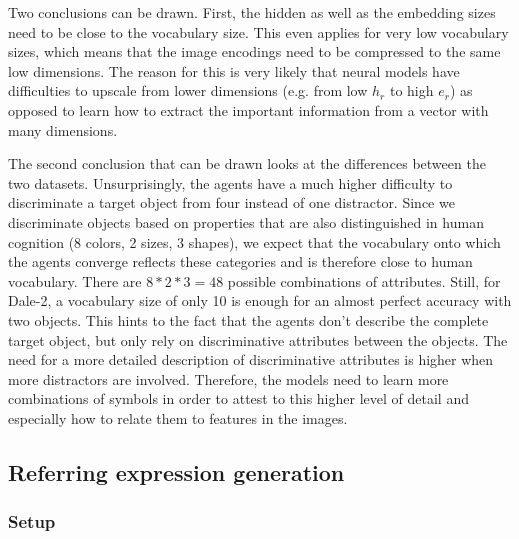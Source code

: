 Two conclusions can be drawn.
First, the hidden as well as the embedding sizes need to be close to the vocabulary size.
This even applies for very low vocabulary sizes, which means that the image encodings need to be compressed to the same low dimensions.
The reason for this is very likely that neural models have difficulties to upscale from lower dimensions (e.g. from low $h_r$ to high $e_r$) as opposed to learn how to extract the important information from a vector with many dimensions.

The second conclusion that can be drawn looks at the differences between the two datasets.
Unsurprisingly, the agents have a much higher difficulty to discriminate a target object from four instead of one distractor.
Since we discriminate objects based on properties that are also distinguished in human cognition (8 colors, 2 sizes, 3 shapes), we expect that the vocabulary onto which the agents converge reflects these categories and is therefore close to human vocabulary.
There are $8*2*3=48$ possible combinations of attributes.
Still, for Dale-2, a vocabulary size of only 10 is enough for an almost perfect accuracy with two objects.
This hints to the fact that the agents don't describe the complete target object, but only rely on discriminative attributes between the objects.
The need for a more detailed description of discriminative attributes is higher when more distractors are involved.
Therefore, the models need to learn more combinations of symbols in order to attest to this higher level of detail and especially how to relate them to features in the images.


\subsection{Referring expression generation}
\subsubsection*{Setup}

